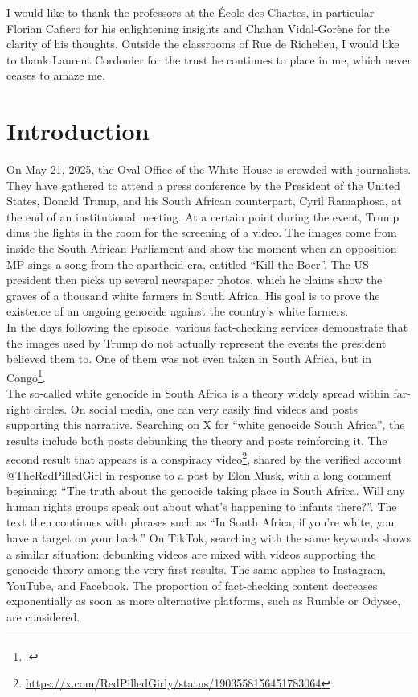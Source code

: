 \documentclass[a4paper,twoside,12pt]{book}
\begin{document}
	\bigskip %
I would like to thank the professors at the École des Chartes, in particular Florian Cafiero for his enlightening insights and Chahan Vidal-Gorène for the clarity of his thoughts. Outside the classrooms of Rue de Richelieu, I would like to thank Laurent Cordonier for the trust he continues to place in me, which never ceases to amaze me.
	
	
	\clearpage
	\thispagestyle{empty}
	\cleardoublepage
	
	\chapter*{Introduction}
	 \label{intro}
	
	On May 21, 2025, the Oval Office of the White House is crowded with journalists. They have gathered to attend a press conference by the President of the United States, Donald Trump, and his South African counterpart, Cyril Ramaphosa, at the end of an institutional meeting. At a certain point during the event, Trump dims the lights in the room for the screening of a video. The images come from inside the South African Parliament and show the moment when an opposition MP sings a song from the apartheid era, entitled \enquote{Kill the Boer}. The US president then picks up several newspaper photos, which he claims show the graves of a thousand white farmers in South Africa. His goal is to prove the existence of an ongoing genocide against the country's white farmers. \\
	In the days following the episode, various fact-checking services demonstrate that the images used by Trump do not actually represent the events the president believed them to. One of them was not even taken in South Africa, but in Congo\footcite{BBC-2025}. \\
	The so-called white genocide in South Africa is a theory widely spread within far-right circles. On social media, one can very easily find videos and posts supporting this narrative. Searching on X for \enquote{white genocide South Africa}, the results include both posts debunking the theory and posts reinforcing it. The second result that appears is a conspiracy video\footnote{\url{https://x.com/RedPilledGirly/status/1903558156451783064}}, shared by the verified account @TheRedPilledGirl in response to a post by Elon Musk, with a long comment beginning: \enquote{The truth about the genocide taking place in South Africa. Will any human rights groups speak out about what’s happening to infants there?}. The text then continues with phrases such as \enquote{In South Africa, if you're white, you have a target on your back.} On TikTok, searching with the same keywords shows a similar situation: debunking videos are mixed with videos supporting the genocide theory among the very first results. The same applies to Instagram, YouTube, and Facebook. The proportion of fact-checking content decreases exponentially as soon as more alternative platforms, such as Rumble or Odysee, are considered. \\
	
\end{document}
